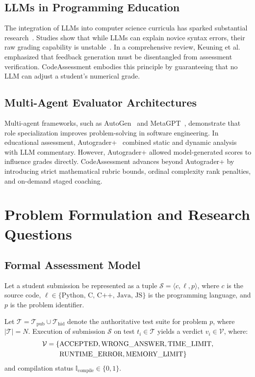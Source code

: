 \documentclass[conference]{IEEEtran}
\begin{document}
\subsection{LLMs in Programming Education}
The integration of LLMs into computer science curricula has sparked substantial research~\cite{macneil2023codeexplanation, prather2023weird, becker2023programming}. Studies show that while LLMs can explain novice syntax errors, their raw grading capability is unstable~\cite{zanjani2022automated}. In a comprehensive review, Keuning et al.~\cite{keuning2018systematic} emphasized that feedback generation must be disentangled from assessment verification. CodeAssessment embodies this principle by guaranteeing that no LLM can adjust a student's numerical grade.

\subsection{Multi-Agent Evaluator Architectures}
Multi-agent frameworks, such as AutoGen~\cite{wu2023autogen} and MetaGPT~\cite{hong2024metagpt}, demonstrate that role specialization improves problem-solving in software engineering. In educational assessment, Autograder+~\cite{sahu2026autograder} combined static and dynamic analysis with LLM commentary. However, Autograder+ allowed model-generated scores to influence grades directly. CodeAssessment advances beyond Autograder+ by introducing strict mathematical rubric bounds, ordinal complexity rank penalties, and on-demand staged coaching.

\section{Problem Formulation and Research Questions}

\subsection{Formal Assessment Model}
Let a student submission be represented as a tuple $\mathcal{S} = \langle c, \ell, p \rangle$, where $c$ is the source code, $\ell \in \{\text{Python, C, C++, Java, JS}\}$ is the programming language, and $p$ is the problem identifier.

Let $\mathcal{T} = \mathcal{T}_{\text{pub}} \cup \mathcal{T}_{\text{hid}}$ denote the authoritative test suite for problem $p$, where $|\mathcal{T}| = N$. Execution of submission $\mathcal{S}$ on test $t_i \in \mathcal{T}$ yields a verdict $v_i \in \mathcal{V}$, where:
\begin{align}
\mathcal{V} = \{ &\text{ACCEPTED}, \text{WRONG\_ANSWER}, \text{TIME\_LIMIT}, \notag \\
                 &\text{RUNTIME\_ERROR}, \text{MEMORY\_LIMIT} \}
\end{align}
and compilation status $\mathbb{I}_{\text{compile}} \in \{0, 1\}$.
\end{document}
